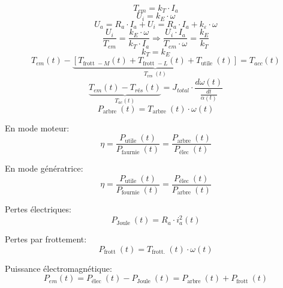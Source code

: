 \documentclass[12pt, twocolumn]{article}
\begin{document}
		\[T_{e m}=k_{T} \cdot I_{a}\]
		\[U_{i}=k_{E} \cdot \omega\]
		\[U_{a}=R_{a} \cdot I_{a}+U_{i}=R_{a} \cdot I_{a}+k_{\varepsilon} \cdot \omega\]
		\[\frac{U_{i}}{T_{e m}}=\frac{k_{E} \cdot \omega}{k_{T} \cdot I_{a}} \Rightarrow \frac{U_{i} \cdot I_{a}}{T_{e m} \cdot \omega}=\frac{k_{E}}{k_{T}}\]
		\[k_{T}=k_{E}\]
		\[T_{e m}(t)-\underbrace{\left[T_{\text {frott }-M}(t)+T_{\text {frott }-L}(t)+T_{\text {utile }}(t)\right]}_{T_{\text {res }}(t)}=T_{a c c}(t)\]
		\[\underbrace{T_{e m}(t)-T_{r é s}(t)}_{T_{a c}(t)}=J_{t o t a l} \cdot \frac{d \omega(t)}{\frac{d t}{\alpha(t)}}\]
		\[P_{\text {arbre }}(t)=T_{\text {arbre }}(t) \cdot \omega(t)\]
		
		En mode moteur:
		\[\eta=\frac{P_{\text {utile }}(t)}{P_{\text {faurnie }}(t)}=\frac{P_{\text {arbre }}(t)}{P_{\text {élec }}(t)}\]
		
		En mode génératrice:
		\[\eta=\frac{P_{\text {utile }}(t)}{P_{\text {fournie }}(t)}=\frac{P_{\text {élec }}(t)}{P_{\text {arbre }}(t)}\]
		
		Pertes électriques:
		\[P_{\text {Joule }}(t)=R_{a} \cdot i_{a}^{2}(t)\]
		
		Pertes par frottement:
		\[P_{\text {frott }}(t)=T_{\text {frott. }}(t) \cdot \omega(t)\]
		
		Puissance électromagnétique:
		\[P_{e m}(t)=P_{\text {élec }}(t)-P_{\text {Joule }}(t)=P_{\text {arbre }}(t)+P_{\text {frott }}(t)\]
\end{document}
